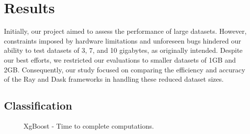 \documentclass[conference]{IEEEtran}
\begin{document}
\section{Results}
Initially, our project aimed to assess the performance of large datasets. However, constraints imposed by hardware limitations and unforeseen bugs hindered our ability to test datasets of 3, 7, and 10 gigabytes, as originally intended. Despite our best efforts, we restricted our evaluations to smaller datasets of 1GB and 2GB. Consequently, our study focused on comparing the efficiency and accuracy of the Ray and Dask frameworks in handling these reduced dataset sizes.
\subsection{Classification}
\FloatBarrier
    \begin{figure}
    \centering
    \caption{XgBoost - Time to complete computations.}
    \end{figure}
    \begin{table}
    \centering
    \caption{XgBoost Time and Accuracy.}
    \end{table}
\end{document}
